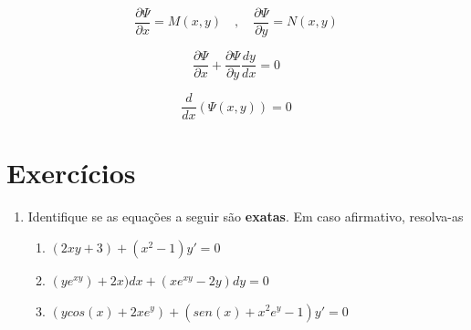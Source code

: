 \documentclass[12pt,a4paper,titlepage]{article}
\begin{document}
\[
    \boxed{\frac{\partial \Psi}{\partial x} = M(x,y)} \quad , \quad \boxed{\frac{\partial \Psi}{\partial y} = N(x,y)}
\]

\[
    \boxed{\frac{\partial \Psi}{\partial x} + \frac{\partial \Psi}{\partial y} \frac{dy}{dx} = 0}
\]

\[
    \boxed{\frac{d}{dx}(\Psi(x,y)) = 0}
\]

\section{Exercícios}
\begin{enumerate}
    \item Identifique se as equações a seguir são \textbf{exatas}. Em caso afirmativo, resolva-as
    \begin{enumerate}
        \item $(2xy + 3) + (x^2-1)y' = 0$
        \item $(ye^{xy}) + 2x)dx + (xe^{xy} - 2y)dy = 0$
        \item $(ycos(x) + 2xe^y) + (sen(x) + x^2e^y - 1)y' = 0$
    \end{enumerate}
\end{enumerate}
\end{document}
